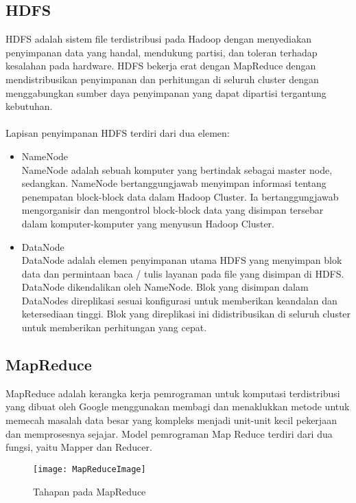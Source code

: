 \subsection{HDFS}
HDFS adalah sistem file terdistribusi pada Hadoop dengan menyediakan penyimpanan data yang handal, mendukung partisi, dan toleran terhadap kesalahan pada hardware. HDFS bekerja erat dengan MapReduce dengan mendistribusikan penyimpanan dan perhitungan di seluruh cluster dengan menggabungkan sumber daya penyimpanan yang dapat dipartisi tergantung kebutuhan. 
\\\\
Lapisan penyimpanan HDFS terdiri dari dua elemen:

\begin{itemize}
\item NameNode\\
NameNode adalah sebuah komputer yang bertindak sebagai master node, sedangkan. NameNode bertanggungjawab menyimpan informasi tentang penempatan block-block data dalam Hadoop Cluster. Ia bertanggungjawab mengorganisir dan mengontrol block-block data yang disimpan tersebar dalam komputer-komputer yang menyusun Hadoop Cluster. 

\item DataNode\\
DataNode adalah elemen penyimpanan utama HDFS yang menyimpan blok data dan permintaan baca / tulis layanan pada file yang disimpan di HDFS. DataNode dikendalikan oleh NameNode. Blok yang disimpan dalam DataNodes direplikasi sesuai konfigurasi untuk memberikan keandalan dan ketersediaan tinggi. Blok yang direplikasi ini didistribusikan di seluruh cluster untuk memberikan perhitungan yang cepat.
\end{itemize}

\subsection{MapReduce}
MapReduce adalah kerangka kerja pemrograman untuk komputasi terdistribusi yang dibuat oleh Google menggunakan membagi dan menaklukkan metode untuk memecah masalah data besar yang kompleks menjadi unit-unit kecil pekerjaan dan memprosesnya sejajar. Model pemrograman Map Reduce terdiri dari dua fungsi, yaitu Mapper dan Reducer. 

\begin{figure}[H]
	\centering
	\texttt{[image: MapReduceImage]}
	\caption{Tahapan pada MapReduce}
	\label{fig:MapReduceImage}
\end{figure}

